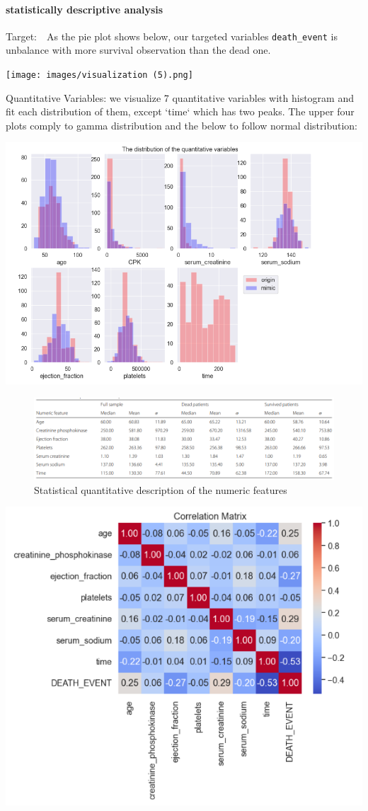 \documentclass[
]{article}
\begin{document}
\paragraph{statistically descriptive
analysis}\label{statistically-descriptive-analysis}

Target:　As the pie plot shows below, our targeted variables
\texttt{death\_event} is unbalance with more survival observation than
the dead one.

\texttt{[image: images/visualization (5).png]}

Quantitative Variables: we visualize 7 quantitative variables with
histogram and fit each distribution of them, except `time` which has two
peaks. The upper four plots comply to gamma distribution and the below
to follow normal distribution:

\includegraphics{quantitative distribution.png}

\begin{figure}
\centering
\includegraphics{table.png}
\caption{Statistical quantitative description of the numeric features}
\end{figure}

\includegraphics{correlative matrix.png}
\end{document}
